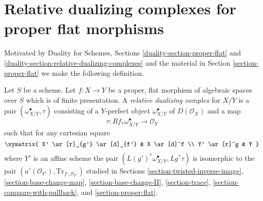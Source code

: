 \section{Relative dualizing complexes for proper flat morphisms}
\label{section-relative-dualizing-proper-flat}

\noindent
Motivated by Duality for Schemes, Sections
\ref{duality-section-proper-flat} and
\ref{duality-section-relative-dualizing-complexes}
and the material in
Section \ref{section-proper-flat}
we make the following definition.

\begin{definition}
\label{definition-relative-dualizing-proper-flat}
Let $S$ be a scheme. Let $f : X \to Y$ be a proper, flat morphism
of algebraic spaces over $S$ which is of finite presentation.
A {\it relative dualizing complex} for $X/Y$ is a pair
$(\omega_{X/Y}^\bullet, \tau)$ consisting of a
$Y$-perfect object $\omega_{X/Y}^\bullet$ of $D(\mathcal{O}_X)$
and a map
$$
\tau : Rf_*\omega_{X/Y}^\bullet \longrightarrow \mathcal{O}_Y
$$
such that for any cartesian square
$$
\xymatrix{
X' \ar[r]_{g'} \ar[d]_{f'} & X \ar[d]^f \\
Y' \ar[r]^g & Y
}
$$
where $Y'$ is an affine scheme the pair
$(L(g')^*\omega_{X/Y}^\bullet, Lg^*\tau)$
is isomorphic to the pair
$(a'(\mathcal{O}_{Y'}), \text{Tr}_{f', \mathcal{O}_{Y'}})$
studied in Sections
\ref{section-twisted-inverse-image},
\ref{section-base-change-map},
\ref{section-base-change-II},
\ref{section-trace},
\ref{section-compare-with-pullback}, and
\ref{section-proper-flat}.
\end{definition}


